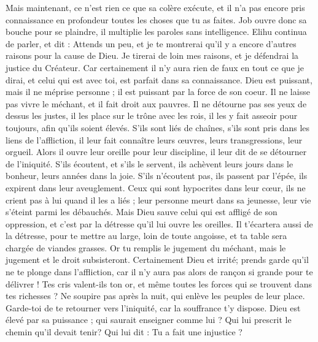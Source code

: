 \begin{multicols}{2}
Mais maintenant, ce n'est rien ce que sa colère exécute, et il n'a pas encore pris connaissance en profondeur toutes les choses que tu as faites.
Job ouvre donc sa bouche pour se plaindre, il multiplie les paroles sans intelligence.
\VerseOne{}Elihu continua de parler, et dit :
Attends un peu, et je te montrerai qu'il y a encore d'autres raisons pour la cause de Dieu.
Je tirerai de loin mes raisons, et je défendrai la justice du Créateur.
Car certainement il n'y aura rien de faux en tout ce que je dirai, et celui qui est avec toi, est parfait dans sa connaissance.
Dieu est puissant, mais il ne méprise personne ; il est puissant par la force de son coeur.
Il ne laisse pas vivre le méchant, et il fait droit aux pauvres.
Il ne détourne pas ses yeux de dessus les justes, il les place sur le trône avec les rois, il les y fait asseoir pour toujours, afin qu'ils soient élevés.
S'ils sont liés de chaînes, s'ils sont pris dans les liens de l'affliction,
il leur fait connaître leurs œuvres, leurs transgressions, leur orgueil.
Alors il ouvre leur oreille pour leur discipline, il leur dit de se détourner de l'iniquité.
S'ils écoutent, et s'ils le servent, ils achèvent leurs jours dans le bonheur, leurs années dans la joie.
S'ils n'écoutent pas, ils passent par l'épée, ils expirent dans leur aveuglement.
Ceux qui sont hypocrites dans leur cœur, ils ne crient pas à lui quand il les a liés ;
leur personne meurt dans sa jeunesse, leur vie s'éteint parmi les débauchés.
Mais Dieu sauve celui qui est affligé de son oppression, et c'est par la détresse qu'il lui ouvre les oreilles.
Il t'écartera aussi de la détresse, pour te mettre au large, loin de toute angoisse, et ta table sera chargée de viandes grasses.
Or tu remplis le jugement du méchant, mais le jugement et le droit subsisteront.
Certainement Dieu et irrité; prends garde qu'il ne te  plonge dans l'affliction, car il n'y aura pas alors de rançon si grande pour te délivrer !
Tes cris valent-ils ton or, et même toutes les forces qui se trouvent dans tes richesses ?
Ne soupire pas après la nuit, qui enlève les peuples de leur place.
Garde-toi de te retourner vers l'iniquité, car la souffrance t'y dispose.
Dieu est élevé par sa puissance ; qui saurait enseigner comme lui ?
Qui lui prescrit le chemin qu'il devait tenir? Qui lui dit : Tu a fait une injustice ?

\end{multicols}
